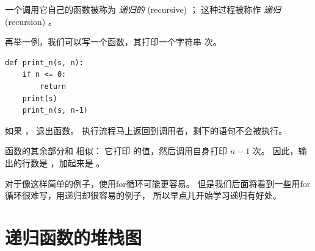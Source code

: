 {{{{%

一个调用它自己的函数被称为 {\em 递归的} (recursive) ；
这种过程被称作 {\em 递归} (recursion) 。

  
  


再举一例，我们可以写一个函数，其打印一个字符串  次。

\begin{lstlisting}
def print_n(s, n):
    if n <= 0:
        return
    print(s)
    print_n(s, n-1)
\end{lstlisting}

%

如果  ， 退出函数。
执行流程马上返回到调用者，剩下的语句不会被执行。
  


函数的其余部分和  相似： 它打印  的值，然后调用自身打印  $n-1$ 次。 因此，输出的行数是  ，加起来是 。


对于像这样简单的例子，使用for循环可能更容易。
但是我们后面将看到一些用for循环很难写，用递归却很容易的例子，
所以早点儿开始学习递归有好处。

  
  

\section{递归函数的堆栈图}
\label{recursive.stack}

}}}}
